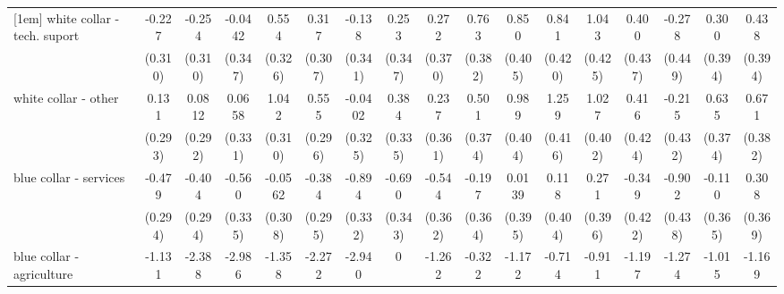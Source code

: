 {\begin{tabular}{l*{16}{c}}
[1em]
white collar - tech. suport&      -0.227         &      -0.254         &     -0.0442         &       0.554         &       0.317         &      -0.138         &       0.253         &       0.272         &       0.763\sym{*}  &       0.850\sym{*}  &       0.841\sym{*}  &       1.043\sym{*}  &       0.400         &      -0.278         &       0.300         &       0.438         \\
                    &     (0.310)         &     (0.310)         &     (0.347)         &     (0.326)         &     (0.307)         &     (0.341)         &     (0.347)         &     (0.370)         &     (0.382)         &     (0.405)         &     (0.420)         &     (0.425)         &     (0.437)         &     (0.449)         &     (0.394)         &     (0.394)         \\
[1em]
white collar - other&       0.131         &      0.0812         &      0.0658         &       1.042\sym{***}&       0.555         &     -0.0402         &       0.384         &       0.237         &       0.501         &       0.989\sym{*}  &       1.259\sym{**} &       1.027\sym{*}  &       0.416         &      -0.215         &       0.635         &       0.671         \\
                    &     (0.293)         &     (0.292)         &     (0.331)         &     (0.310)         &     (0.296)         &     (0.325)         &     (0.335)         &     (0.361)         &     (0.374)         &     (0.404)         &     (0.416)         &     (0.402)         &     (0.424)         &     (0.432)         &     (0.374)         &     (0.382)         \\
[1em]
blue collar - services&      -0.479         &      -0.404         &      -0.560         &     -0.0562         &      -0.384         &      -0.894\sym{**} &      -0.690\sym{*}  &      -0.544         &      -0.197         &      0.0139         &       0.118         &       0.271         &      -0.349         &      -0.902\sym{*}  &      -0.110         &       0.308         \\
                    &     (0.294)         &     (0.294)         &     (0.335)         &     (0.308)         &     (0.295)         &     (0.332)         &     (0.343)         &     (0.362)         &     (0.364)         &     (0.395)         &     (0.404)         &     (0.396)         &     (0.422)         &     (0.438)         &     (0.365)         &     (0.369)         \\
[1em]
blue collar - agriculture&      -1.131         &      -2.388\sym{**} &      -2.986\sym{**} &      -1.358         &      -2.272\sym{*}  &      -2.940\sym{**} &           0         &      -1.262         &      -0.322         &      -1.172         &      -0.714         &      -0.911         &      -1.197         &      -1.274         &      -1.015         &      -1.169         \\

\end{tabular}}
